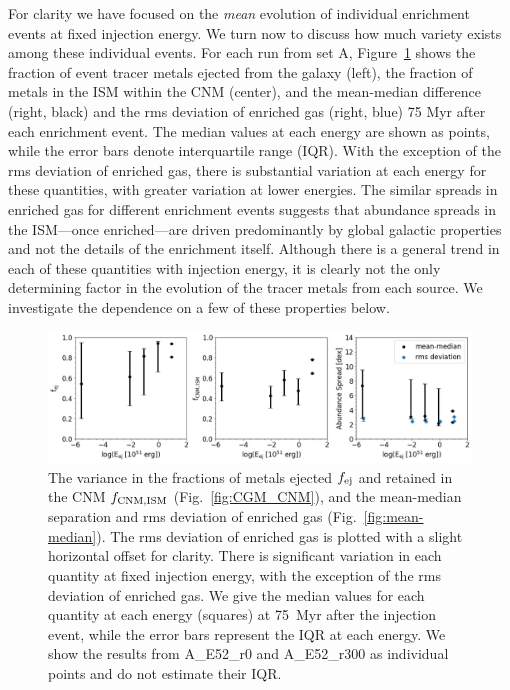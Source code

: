 \documentclass[twocolumn]{aastex62}
\newcommand{\runone}{A\_}
\newcommand{\runonenu}{A}
\begin{document}
For clarity we have focused on the \textit{mean} evolution of individual enrichment events at fixed injection energy. We turn now to discuss how much variety exists among these individual events. For each run from set \runonenu, Figure~\ref{fig:CGM_CNM_variance} shows the fraction of event tracer metals ejected from the galaxy (left), the fraction of metals in the ISM within the CNM (center), and the mean-median difference (right, black) and the rms deviation of enriched gas (right, blue) 75 Myr after each enrichment event. The median values at each energy are shown as points, while the error bars denote interquartile range (IQR). With the exception of the rms deviation of enriched gas, there is substantial variation at each energy for these quantities, with greater variation at lower energies. The similar spreads in enriched gas for different enrichment events suggests that abundance spreads in the ISM---once enriched---are driven predominantly by global galactic properties and not the details of the enrichment itself. Although there is a general trend in each of these quantities with injection energy, it is clearly not the only determining factor in the evolution of the tracer metals from each source. We investigate the dependence on a few of these properties below.

 \begin{figure}
   \centering
   \includegraphics[width=0.975\linewidth]{combined_rms_Eej_CNM_avg}
   \caption{The variance in the fractions of metals ejected $f_{\rm ej}$ and retained in the CNM $f_{\rm CNM, ISM}$ (Fig.~\ref{fig:CGM_CNM}), and the mean-median separation and rms deviation of enriched gas (Fig.~\ref{fig:mean-median}). The rms deviation of enriched gas is plotted with a slight horizontal offset for clarity. There is significant variation in each quantity at fixed injection energy, with the exception of the rms deviation of enriched gas. We give the median values for each quantity at each energy (squares) at 75~Myr after the injection event, while the error bars represent the IQR at each energy. We show the results from \runone E52\_r0 and \runone E52\_r300 as individual points and do not estimate their IQR.}
   \label{fig:CGM_CNM_variance}
 \end{figure}
\end{document}
